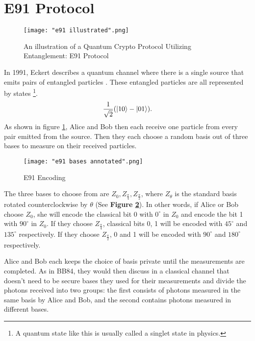 \pagebreak


\section{E91 Protocol} \label{section: e91}
\begin{figure}[h]
    \centering
    \texttt{[image: "e91 illustrated".png]}
    \caption{An illustration of a Quantum Crypto Protocol Utilizing Entanglement: E91 Protocol \protect\footnotemark}
    \label{fig:E91 Illustrated}
\end{figure}


In 1991, Eckert describes a quantum channel where there is a single source that emits pairs of entangled particles \cite{Ekert1991}. These entangled particles are all represented by states \footnote{A quantum state like this is usually called a singlet state in physics.}.
$$\frac{1}{\sqrt{2}}(\ket{10}-\ket{01}).$$
As shown in figure \ref{fig:E91 Illustrated}, Alice and Bob then each receive one particle from every pair emitted from the source. Then they each choose a random basis out of three bases to measure on their received particles. 

\begin{figure}[h]
    \centering
    \texttt{[image: "e91 bases annotated".png]}
    \caption{E91 Encoding}
    \label{fig:e91 encoding}
\end{figure}

The three bases to choose from are $Z_0, Z_{\frac{\pi}{4}}, Z_{\frac{\pi}{2}}$, where $Z_\theta$ is the standard basis rotated counterclockwise by $\theta$ (See \textbf{Figure \ref{fig:e91 encoding}}). In other words, if Alice or Bob choose $Z_0$, she will encode the classical bit 0 with  $0^\circ$ in $Z_0$ and encode the bit 1 with $90^\circ$ in $Z_0$. If they choose $Z_{\frac{\pi}{4}}$, classical bits 0, 1 will be encoded with $45^\circ$ and $135^\circ$ respectively. If they choose $Z_{\frac{\pi}{2}}$, 0 and 1 will be encoded with $90^\circ$ and $180^\circ$ respectively.

Alice and Bob each keeps the choice of basis private until the measurements are completed. As in BB84, they would then discuss in a classical channel that doesn't need to be secure bases they used for their measurements and divide the photons received into two groups: the first consists of photons measured in the same basis by Alice and Bob, and the second contains photons measured in different bases. 

